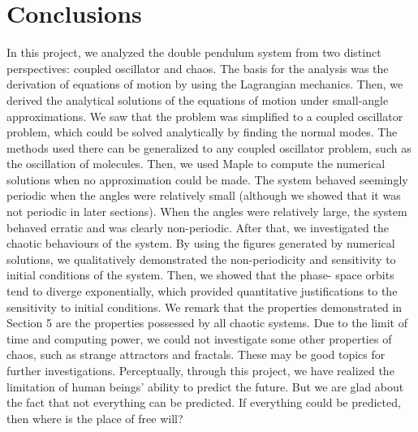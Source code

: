 \documentclass[11pt]{article}
\begin{document}
\section{Conclusions}
In this project, we analyzed the double pendulum system from two distinct perspectives: coupled oscillator and chaos. The basis
for the analysis was the derivation of equations of motion by using the Lagrangian mechanics. Then, we derived the analytical
solutions of the equations of motion under small-angle approximations. We saw that the problem was simplified to a coupled oscillator
problem, which could be solved analytically by finding the normal modes. The methods used there can be generalized to any coupled
oscillator problem, such as the oscillation of molecules. Then, we used Maple to compute the numerical solutions when no
approximation could be made. The system behaved seemingly periodic when the angles were relatively small (although we showed that it
was not periodic in later sections). When the angles were relatively large, the system behaved erratic and was clearly non-periodic.
After that, we investigated the chaotic behaviours of the system. By using the figures generated by numerical solutions, we
qualitatively demonstrated the non-periodicity and sensitivity to initial conditions of the system. Then, we showed that the phase-
space orbits tend to diverge exponentially, which provided quantitative justifications to the sensitivity to initial conditions. We
remark that the properties demonstrated in Section 5 are the properties possessed by all chaotic systems. Due to the limit of time
and computing power, we could not investigate some other properties of chaos, such as strange attractors and fractals. These may be
good topics for further investigations. Perceptually, through this project, we have realized the limitation of human beings' ability
to predict the future. But we are glad about the fact that not everything can be predicted. If everything could be predicted, then
where is the place of free will?
\end{document}
